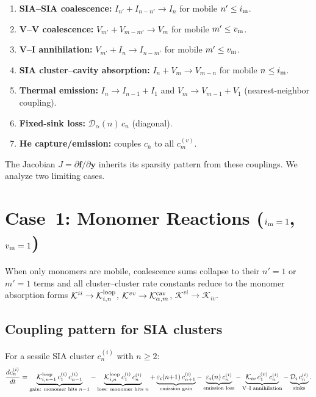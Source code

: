 \documentclass[11pt]{article}
\newcommand{\im}{i_{\rm m}}
\newcommand{\vm}{v_{\rm m}}
\newcommand{\Kii}{\mathcal{K}^{ii}}
\newcommand{\Kvv}{\mathcal{K}^{vv}}
\newcommand{\Kvi}{\mathcal{K}^{vi}}
\newcommand{\Dsink}{\mathcal{D}}
\newcommand{\eps}{\varepsilon}
\begin{document}
\begin{enumerate}
  \item \textbf{SIA--SIA coalescence:}
    $I_{n'} + I_{n-n'} \to I_{n}$ for mobile $n' \le \im$.
  \item \textbf{V--V coalescence:}
    $V_{m'} + V_{m-m'} \to V_{m}$ for mobile $m' \le \vm$.
  \item \textbf{V--I annihilation:}
    $V_{m'} + I_{n} \to I_{n-m'}$ for mobile $m' \le \vm$.
  \item \textbf{SIA cluster--cavity absorption:}
    $I_{n} + V_{m} \to V_{m-n}$ for mobile $n \le \im$.
  \item \textbf{Thermal emission:}
    $I_{n} \to I_{n-1} + I_{1}$ and
    $V_{m} \to V_{m-1} + V_{1}$ (nearest-neighbor coupling).
  \item \textbf{Fixed-sink loss:}
    $\Dsink_{\alpha}(n)\,c_{n}$ (diagonal).
  \item \textbf{He capture/emission:} couples $c_{h}$ to all $c_{m}^{(v)}$.
\end{enumerate}

The Jacobian $J = \partial\mathbf{f}/\partial\mathbf{y}$ inherits its
sparsity pattern from these couplings. We analyze two limiting cases.

\section{Case~1: Monomer Reactions ($\im = 1$, $\vm = 1$)}
\label{sec:monomer}

When only monomers are mobile, coalescence sums collapse to their
$n' = 1$ or $m' = 1$ terms and all cluster--cluster rate constants
reduce to the monomer absorption forms
$\Kii \to \mathcal{K}_{i,n}^{\rm loop}$,\;
$\Kvv \to \mathcal{K}_{\alpha,m}^{\rm cav}$,\;
$\Kvi \to \mathcal{K}_{iv}$.

\subsection{Coupling pattern for SIA clusters}

For a sessile SIA cluster $c_{n}^{(i)}$ with $n \ge 2$:
\begin{equation}
  \frac{dc_{n}^{(i)}}{dt} =
  \underbrace{\mathcal{K}_{i,n-1}^{\rm loop}\,c_{1}^{(i)}\,c_{n-1}^{(i)}}_{\text{gain: monomer hits }n{-}1}
  - \underbrace{\mathcal{K}_{i,n}^{\rm loop}\,c_{1}^{(i)}\,c_{n}^{(i)}}_{\text{loss: monomer hits }n}
  + \underbrace{\eps_{i}(n{+}1)\,c_{n+1}^{(i)}}_{\text{emission gain}}
  - \underbrace{\eps_{i}(n)\,c_{n}^{(i)}}_{\text{emission loss}}
  - \underbrace{\mathcal{K}_{iv}\,c_{1}^{(v)}\,c_{n}^{(i)}}_{\text{V--I annihilation}}
  - \underbrace{\Dsink_{i}\,c_{n}^{(i)}}_{\text{sinks}}.
  \label{eq:dcn_mono}
\end{equation}
\end{document}
